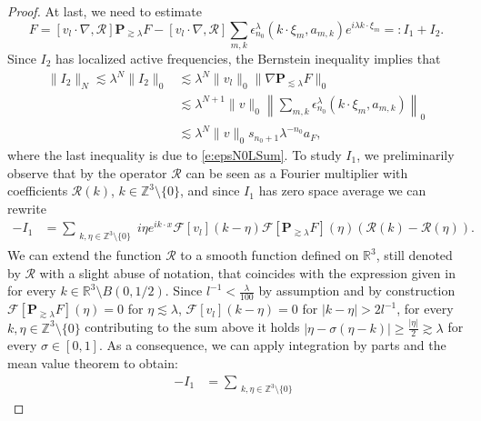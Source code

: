 \documentclass[10pt,a4paper]{amsart}
\numberwithin{equation}{section}
\numberwithin{corollario}{section}
\numberwithin{lemma}{section}
\numberwithin{prop}{section}
\theoremstyle{definition}
\theoremstyle{remark}
\newcommand{\Z}{\mathbb{Z}}
\newcommand{\R}{\mathbb{R}}
\newcommand{\proj}{\mathbf{P}}
\begin{document}
\begin{proof}
At last, we need to estimate
\begin{equation}
    [v_l\cdot\nabla,\mathcal{R}]F
    =
    [v_l\cdot\nabla,\mathcal{R}]\proj_{\gtrsim \lambda}F
    -
    [v_l\cdot \nabla,\mathcal{R}]\sum_{m,k}\epsilon^{\lambda}_{n_0}(k\cdot \xi_m,a_{m,k})e^{i\lambda k\cdot \xi_m}=:I_1+I_2.
\end{equation}
Since $I_2$ has localized active frequencies, the Bernstein inequality implies that
\begin{equation}\label{est:DRF3}
\begin{aligned}
    \|I_2\|_N\lesssim \lambda^N\|I_2\|_0&\lesssim\lambda^N\|v_l\|_0\|\nabla \proj_{\lesssim\lambda}F\|_0
    \\
    &\lesssim
    \lambda^{N+1} \|v\|_0 \left\|\sum_{m,k}\epsilon^{\lambda}_{n_0}(k\cdot \xi_m,a_{m,k})\right\|_0\\
    &\lesssim \lambda^N\|v\|_0s_{n_0+1}\lambda^{-n_0}a_F,
\end{aligned}
\end{equation}
where the last inequality is due to \eqref{e:epsN0LSum}.
To study $I_1$, we preliminarily observe that by \cite[Proposition 4.12]{RT25} the operator $\mathcal{R}$ can be seen as a Fourier multiplier with coefficients $\mathscr{R}(k)$, $k \in \mathbb{Z}^3 \setminus \{0\}$, and since $I_1$ has zero space average we can rewrite
\begin{align}
    -I_1
        &=
        \sum_{\substack{k,\eta \in \Z^3 \setminus \{0\}}}
        i\eta e^{ik\cdot x}\mathscr{F}[v_l](k-\eta)\mathscr{F}[\proj_{\gtrsim \lambda}F](\eta)
        \left( \mathscr{R}(k)-\mathscr{R}(\eta) \right).
\end{align}
We can extend the function $\mathscr{R}$ to a smooth function defined on $\R^3$, still denoted by $\mathscr{R}$ with a slight abuse of notation, that coincides with the expression given in \cite[Equation 4.17]{RT25} for every $k \in \R^3 \setminus B(0,1/2)$. 
Since $l^{-1} < \frac{\lambda}{100}$ by assumption and by construction $\mathscr{F}[\proj_{\gtrsim \lambda}F](\eta) = 0$ for $\eta \lesssim \lambda$, $\mathscr{F}[v_l](k-\eta) = 0$ for $|k-\eta| > 2l^{-1}$, for every $k,\eta \in \Z^3 \setminus \{0\}$ contributing to the sum above it holds $|\eta-\sigma(\eta-k)|\geq \frac{|\eta|}2 \gtrsim \lambda$ for every $\sigma \in [0,1]$. As a consequence, we can apply integration by parts and the mean value theorem to obtain:
\begin{equation}
    \begin{aligned}
        -I_1
        &=
        \sum_{\substack{k,\eta \in \Z^3\setminus \{0\}}}

\end{aligned}
\end{equation}
\end{proof}
\end{document}
